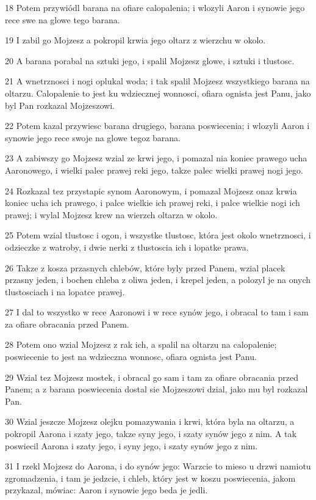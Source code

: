 \par 18 Potem przywiódl barana na ofiare calopalenia; i wlozyli Aaron i synowie jego rece swe na glowe tego barana.
\par 19 I zabil go Mojzesz a pokropil krwia jego oltarz z wierzchu w okolo.
\par 20 A barana porabal na sztuki jego, i spalil Mojzesz glowe, i sztuki i tlustosc.
\par 21 A wnetrznosci i nogi oplukal woda; i tak spalil Mojzesz wszystkiego barana na oltarzu. Calopalenie to jest ku wdziecznej wonnosci, ofiara ognista jest Panu, jako byl Pan rozkazal Mojzeszowi.
\par 22 Potem kazal przywiesc barana drugiego, barana poswiecenia; i wlozyli Aaron i synowie jego rece swoje na glowe tegoz barana.
\par 23 A zabiwszy go Mojzesz wzial ze krwi jego, i pomazal nia koniec prawego ucha Aaronowego, i wielki palec prawej reki jego, takze palec wielki prawej nogi jego.
\par 24 Rozkazal tez przystapic synom Aaronowym, i pomazal Mojzesz onaz krwia koniec ucha ich prawego, i palce wielkie ich prawej reki, i palce wielkie nogi ich prawej; i wylal Mojzesz krew na wierzch oltarza w okolo.
\par 25 Potem wzial tlustosc i ogon, i wszystke tlustosc, która jest okolo wnetrznosci, i odzieczke z watroby, i dwie nerki z tlustoscia ich i lopatke prawa.
\par 26 Takze z kosza przasnych chlebów, które byly przed Panem, wzial placek przasny jeden, i bochen chleba z oliwa jeden, i krepel jeden, a polozyl je na onych tlustosciach i na lopatce prawej.
\par 27 I dal to wszystko w rece Aaronowi i w rece synów jego, i obracal to tam i sam za ofiare obracania przed Panem.
\par 28 Potem ono wzial Mojzesz z rak ich, a spalil na oltarzu na calopalenie; poswiecenie to jest na wdzieczna wonnosc, ofiara ognista jest Panu.
\par 29 Wzial tez Mojzesz mostek, i obracal go sam i tam za ofiare obracania przed Panem; a z barana poswiecenia dostal sie Mojzeszowi dzial, jako mu byl rozkazal Pan.
\par 30 Wzial jeszcze Mojzesz olejku pomazywania i krwi, która byla na oltarzu, a pokropil Aarona i szaty jego, takze syny jego, i szaty synów jego z nim. A tak poswiecil Aarona i szaty jego, i syny jego, i szaty synów jego z nim.
\par 31 I rzekl Mojzesz do Aarona, i do synów jego: Warzcie to mieso u drzwi namiotu zgromadzenia, i tam je jedzcie, i chleb, który jest w koszu poswiecenia, jakom przykazal, mówiac: Aaron i synowie jego beda je jedli.
